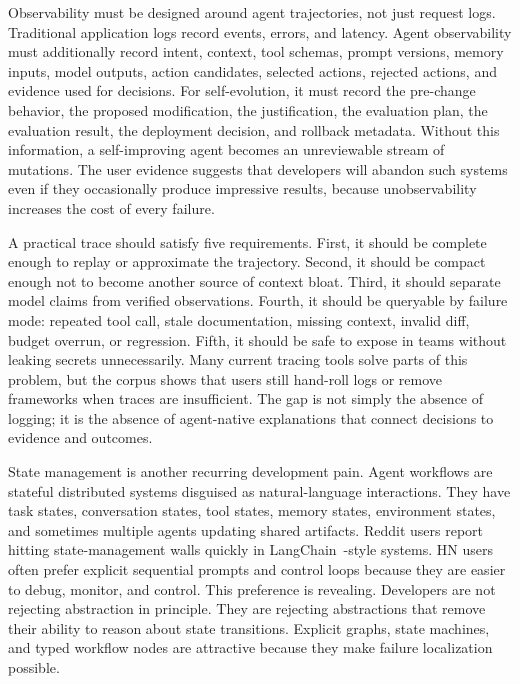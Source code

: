 Observability must be designed around agent trajectories, not just request logs. Traditional application logs record events, errors, and latency. Agent observability must additionally record intent, context, tool schemas, prompt versions, memory inputs, model outputs, action candidates, selected actions, rejected actions, and evidence used for decisions. For self-evolution, it must record the pre-change behavior, the proposed modification, the justification, the evaluation plan, the evaluation result, the deployment decision, and rollback metadata. Without this information, a self-improving agent becomes an unreviewable stream of mutations. The user evidence suggests that developers will abandon such systems even if they occasionally produce impressive results, because unobservability increases the cost of every failure.

A practical trace should satisfy five requirements. First, it should be complete enough to replay or approximate the trajectory. Second, it should be compact enough not to become another source of context bloat. Third, it should separate model claims from verified observations. Fourth, it should be queryable by failure mode: repeated tool call, stale documentation, missing context, invalid diff, budget overrun, or regression. Fifth, it should be safe to expose in teams without leaking secrets unnecessarily. Many current tracing tools solve parts of this problem, but the corpus shows that users still hand-roll logs or remove frameworks when traces are insufficient. The gap is not simply the absence of logging; it is the absence of agent-native explanations that connect decisions to evidence and outcomes.

State management is another recurring development pain. Agent workflows are stateful distributed systems disguised as natural-language interactions. They have task states, conversation states, tool states, memory states, environment states, and sometimes multiple agents updating shared artifacts. Reddit users report hitting state-management walls quickly in LangChain~\cite{chase2023langchain}-style systems. HN users often prefer explicit sequential prompts and control loops because they are easier to debug, monitor, and control. This preference is revealing. Developers are not rejecting abstraction in principle. They are rejecting abstractions that remove their ability to reason about state transitions. Explicit graphs, state machines, and typed workflow nodes are attractive because they make failure localization possible.

